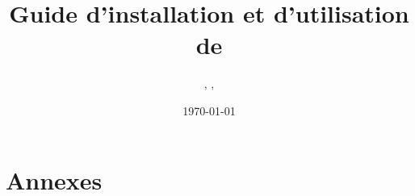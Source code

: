 \documentclass[a4paper, 11pt]{article}
\author{\glsentryname{leo}, \glsentryname{damien}, \glsentryname{pierreLouis}}
\title{Guide d'installation et d'utilisation de \glsentryname{sae}}
\date{\normalsize\today} %
\begin{document}
\maketitle

\newpage
{} %


\newpage
\tableofcontents

\newpage


\newpage


\newpage
\part*{Annexes}
\listoffigures
\listoftables

\newpage
\printglossary %

\newpage
\printbibliography %
\end{document}
